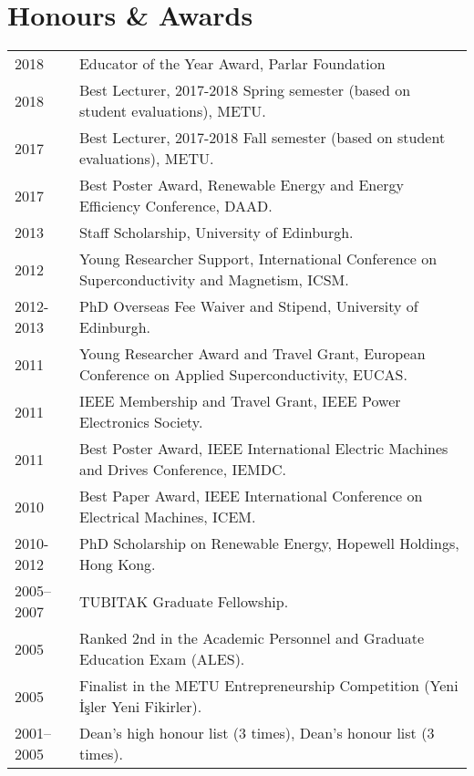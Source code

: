 \documentclass[a4paper,12pt]{article}
\begin{document}
\section{Honours \& Awards}
\begin{tabular}{lp{16cm}}
2018 & Educator of the Year Award, Parlar Foundation \\
2018 & Best Lecturer, 2017-2018 Spring semester (based on student evaluations), METU. \\
2017 & Best Lecturer, 2017-2018 Fall semester (based on student evaluations), METU. \\
2017 & Best Poster Award, Renewable Energy and Energy Efficiency Conference, DAAD. \\
2013 & Staff Scholarship, University of Edinburgh. \\
2012 & Young Researcher Support, International Conference on Superconductivity and Magnetism, ICSM.\\ 
2012-2013 & PhD Overseas Fee Waiver and Stipend, University of Edinburgh. \\
2011 & Young Researcher Award and Travel Grant, European Conference on Applied Superconductivity, EUCAS.\\ 
2011 & IEEE Membership and Travel Grant, IEEE Power Electronics Society. \\ 
2011 & Best Poster Award, IEEE International Electric Machines and Drives Conference, IEMDC. \\
2010 & Best Paper Award, IEEE International Conference on Electrical Machines, ICEM. \\
2010-2012 & PhD Scholarship on Renewable Energy, Hopewell Holdings, Hong Kong. \\
2005--2007 & TUBITAK Graduate Fellowship. \\
2005 & Ranked 2nd in the Academic Personnel and Graduate Education Exam (ALES).\\
2005 & Finalist in the METU Entrepreneurship Competition (Yeni İşler Yeni Fikirler).\\
2001--2005 & Dean's high honour list (3 times), Dean's honour list (3 times). \\
\end{tabular}
\end{document}
